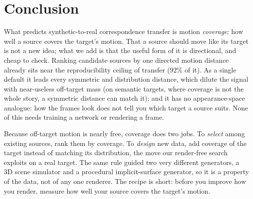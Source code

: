 \section{Conclusion}
\label{sec:conclusion}

What predicts synthetic-to-real correspondence transfer is motion
\emph{coverage}: how well a source covers the target's motion. That a source
should move like its target is not a new idea; what we add is that the useful
form of it is directional, and cheap to check. Ranking candidate sources by one
directed motion distance already sits near the reproducibility ceiling of transfer
($92\%$ of it).
As a single default it leads every symmetric and distribution distance, which
dilute the signal with near-useless off-target mass (on semantic targets, where
coverage is not the whole story, a symmetric distance can match it); and it has no
appearance-space analogue: how the frames look does not tell you which target a
source suits. None of this needs
training a network or rendering a frame.

Because off-target motion is nearly free, coverage does two jobs. To
\emph{select} among existing sources, rank them by coverage. To \emph{design} new
data, add coverage of the target instead of matching its distribution, the move
our render-free search exploits on a real target. The same rule guided two very
different generators, a 3D scene simulator and a procedural implicit-surface
generator, so it is a property of the data, not of any one renderer. The recipe
is short: before you improve how you render, measure how well your source covers
the target's motion.

